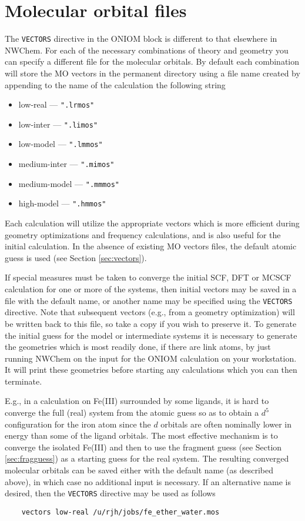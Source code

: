 \section{Molecular orbital files}

The \verb+VECTORS+ directive in the ONIOM block is different to that
elsewhere in NWChem.  For each of the necessary combinations of theory
and geometry you can specify a different file for the molecular
orbitals.  By default each combination will store the MO vectors in
the permanent directory using a file name created by appending to the
name of the calculation the following string
\begin{itemize}
\item low-real  --- \verb+".lrmos"+
\item low-inter --- \verb+".limos"+
\item low-model --- \verb+".lmmos"+
\item medium-inter --- \verb+".mimos"+
\item medium-model --- \verb+".mmmos"+
\item high-model --- \verb+".hmmos"+
\end{itemize}
Each calculation will utilize the appropriate vectors which is more
efficient during geometry optimizations and frequency calculations,
and is also useful for the initial calculation.  In the absence of
existing MO vectors files, the default atomic guess is used (see
Section \ref{sec:vectors}).

If special measures must be taken to converge the initial SCF, DFT or
MCSCF calculation for one or more of the systems, then initial vectors
may be saved in a file with the default name, or another name may be
specified using the \verb+VECTORS+ directive.  Note that subsequent
vectors (e.g., from a geometry optimization) will be written back to
this file, so take a copy if you wish to preserve it.  
To generate the initial guess for the model or intermediate systems
it is necessary to generate the geometries which is most readily
done, if there are link atoms, by just running NWChem on the
input for the ONIOM calculation on your workstation.  It will
print these geometries before starting any calculations which 
you can then terminate.

E.g., in a calculation on Fe(III) surrounded by some ligands, it is
hard to converge the full (real) system from the atomic guess so as to
obtain a $d^5$ configuration for the iron atom since the $d$ orbitals
are often nominally lower in energy than some of the ligand orbitals.
The most effective mechanism is to converge the isolated Fe(III) and
then to use the fragment guess (see Section \ref{sec:fragguess}) as a
starting guess for the real system.  The resulting converged molecular
orbitals can be saved either with the default name (as described
above), in which case no additional input is necessary.  If an
alternative name is desired, then the \verb+VECTORS+ directive may be
used as follows
\begin{verbatim}
    vectors low-real /u/rjh/jobs/fe_ether_water.mos
\end{verbatim}

